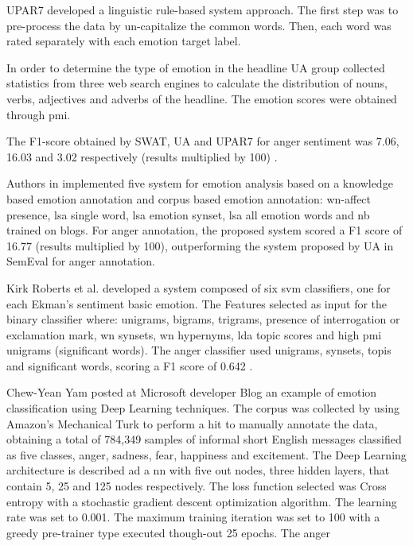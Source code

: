 UPAR7 developed a linguistic rule-based system approach. The first step was to pre-process the data by un-capitalize the common words. Then, each word was rated separately with each emotion target label. 

In order to determine the type of emotion in the headline UA group collected statistics from three web search engines to calculate the distribution of nouns, verbs, adjectives and adverbs of the headline. The emotion scores were obtained through \acrfull{pmi}.

The F1-score obtained by SWAT, UA and UPAR7 for anger sentiment was 7.06, 16.03 and 3.02 respectively (results multiplied by 100) \cite{strapparava2007semeval}.

Authors in \cite{strapparava2008learning} implemented five system for emotion analysis based on a knowledge based emotion annotation and corpus based emotion annotation: \acrshort{wn}-affect presence, \acrshort{lsa} single word, \acrshort{lsa} emotion synset, \acrshort{lsa} all emotion words and \acrshort{nb} trained on blogs. For anger annotation, the proposed system scored a F1 score of 16.77 (results multiplied by 100), outperforming the system proposed by UA in SemEval for anger annotation.

Kirk Roberts et al. developed a system composed of six \acrshort{svm} classifiers, one for each Ekman's sentiment basic emotion. The Features selected as input for the binary classifier where: unigrams, bigrams, trigrams, presence of interrogation or exclamation mark, \acrlong{wn} synsets, \acrshort{wn} hypernyms, \acrlong{lda} topic scores and high \acrshort{pmi} unigrams (significant words). The anger classifier used unigrams, synsets, topis and significant words, scoring a F1 score of 0.642 \cite{roberts2012empatweet}.

Chew-Yean Yam posted at Microsoft developer Blog an example of emotion classification using Deep Learning techniques. The corpus was collected by using Amazon's Mechanical Turk to perform a \acrfull{hit} to manually annotate the data, obtaining a total of 784,349 samples of informal short English messages classified as five classes, anger, sadness, fear, happiness and excitement. The Deep Learning architecture is described ad a \acrfull{nn} with five out nodes, three hidden layers, that contain 5, 25 and 125 nodes respectively. The loss function selected was Cross entropy with a stochastic gradient descent optimization algorithm. The learning rate was set to 0.001. The maximum training iteration was set to 100 with a greedy pre-trainer type executed though-out 25 epochs. The anger \cite{microsoftEmotionAPI}



